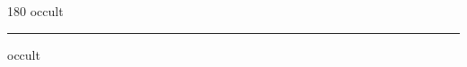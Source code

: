 
\begin{frame}
\begin{center}
\begin{turn}{180}
{\fontsize{2.5cm}{1em}\selectfont occult}
\end{turn}
\vspace{1em}\par  
\hrule
\vspace{1em}\par  
{\fontsize{2.5cm}{1em}\selectfont occult}
\end{center}
\end{frame}
